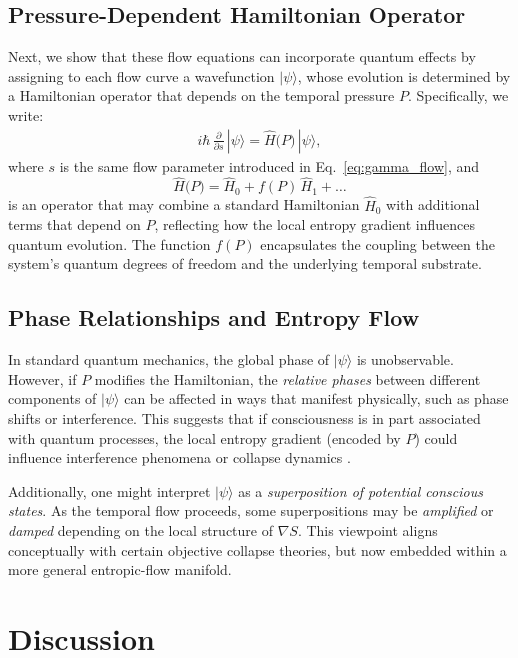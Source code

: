 \documentclass[12pt]{article}
\begin{document}
\subsection{Pressure-Dependent Hamiltonian Operator}
Next, we show that these flow equations can incorporate quantum effects by assigning to each flow curve a wavefunction $|\psi\rangle$, whose evolution is determined by a Hamiltonian operator that depends on the temporal pressure $P$. Specifically, we write:
\begin{align}
i\hbar \,\frac{\partial}{\partial s}\,|\psi\rangle 
= 
\hat{H}\bigl(P\bigr)\,|\psi\rangle,
\label{eq:schrodinger_equation}
\end{align}
where $s$ is the same flow parameter introduced in Eq.~\eqref{eq:gamma_flow}, and
\begin{equation}
\hat{H}\bigl(P\bigr) 
= 
\hat{H}_0 + f(P)\,\hat{H}_1 + \dots
\end{equation}
is an operator that may combine a standard Hamiltonian $\hat{H}_0$ with additional terms that depend on $P$, reflecting how the local entropy gradient influences quantum evolution. The function $f(P)$ encapsulates the coupling between the system's quantum degrees of freedom and the underlying temporal substrate.

\subsection{Phase Relationships and Entropy Flow}
In standard quantum mechanics, the global phase of $|\psi\rangle$ is unobservable. However, if $P$ modifies the Hamiltonian, the \emph{relative phases} between different components of $|\psi\rangle$ can be affected in ways that manifest physically, such as phase shifts or interference. This suggests that if consciousness is in part associated with quantum processes, the local entropy gradient (encoded by $P$) could influence interference phenomena or collapse dynamics \cite{pearle1976reduction}.

Additionally, one might interpret $|\psi\rangle$ as a \emph{superposition of potential conscious states}. As the temporal flow proceeds, some superpositions may be \emph{amplified} or \emph{damped} depending on the local structure of $\nabla S$. This viewpoint aligns conceptually with certain objective collapse theories, but now embedded within a more general entropic-flow manifold.

\section{Discussion}
\label{sec:discussion}
\end{document}
